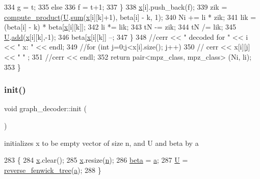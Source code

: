 \begin{DoxyCode}
334         g = t;
335       \textcolor{keywordflow}{else}
336         f = t+1;
337     \}
338     \hyperlink{classgraph__decoder_aa3f2776afe387668cf7f68109428e14e}{x}[i].push\_back(f);
339     zik = \hyperlink{compression__helper_8cpp_ae2afb43aabe50f7d42aae8f82b5a35f4}{compute\_product}(\hyperlink{classgraph__decoder_a2fa9fec2cef06aaa410e57fb59d5c1ad}{U}.\hyperlink{classreverse__fenwick__tree_a672731fd6395b4853430073a099a80e6}{sum}(\hyperlink{classgraph__decoder_aa3f2776afe387668cf7f68109428e14e}{x}[i][k]+1), beta[i] - k, 1);
340     Ni += li * zik;
341     lik = (beta[i] - k) * beta[\hyperlink{classgraph__decoder_aa3f2776afe387668cf7f68109428e14e}{x}[i][k]];
342     li *= lik;
343     tN -= zik;
344     tN /= lik;
345     \hyperlink{classgraph__decoder_a2fa9fec2cef06aaa410e57fb59d5c1ad}{U}.\hyperlink{classreverse__fenwick__tree_a942d7f49b37e53ebfec3076d177691d7}{add}(\hyperlink{classgraph__decoder_aa3f2776afe387668cf7f68109428e14e}{x}[i][k],-1);
346     beta[\hyperlink{classgraph__decoder_aa3f2776afe387668cf7f68109428e14e}{x}[i][k]] --;
347   \}
348   \textcolor{comment}{//cerr << " decoded for " << i << " x: " << endl;}
349   \textcolor{comment}{//for (int j=0;j<x[i].size(); j++)}
350   \textcolor{comment}{//  cerr << x[i][j] << " " ;}
351   \textcolor{comment}{//cerr << endl;}
352   \textcolor{keywordflow}{return} pair<mpz\_class, mpz\_class> (Ni, li);
353 \}
\end{DoxyCode}
\mbox{\label{classgraph__decoder_a97a9dcd5af21ece86fa91adcb41ca9cc}} 
\subsubsection{\texorpdfstring{init()}{init()}}
{\footnotesize\ttfamily void graph\+\_\+decoder\+::init (\begin{DoxyParamCaption}{ }\end{DoxyParamCaption})}



initializes x to be empty vector of size n, and U and beta by a 


\begin{DoxyCode}
283 \{
284   \hyperlink{classgraph__decoder_aa3f2776afe387668cf7f68109428e14e}{x}.clear();
285   \hyperlink{classgraph__decoder_aa3f2776afe387668cf7f68109428e14e}{x}.resize(\hyperlink{classgraph__decoder_a6bc1e72b2f7a913d14b789a6c2d92c1e}{n});
286   \hyperlink{classgraph__decoder_aa57c11e4c09c52101682ff83286162f7}{beta} = \hyperlink{classgraph__decoder_a9dd7c3c11b8a45a12cb7c3c2d2bfa2cc}{a};
287   \hyperlink{classgraph__decoder_a2fa9fec2cef06aaa410e57fb59d5c1ad}{U} = \hyperlink{classreverse__fenwick__tree}{reverse\_fenwick\_tree}(\hyperlink{classgraph__decoder_a9dd7c3c11b8a45a12cb7c3c2d2bfa2cc}{a});
288 \}
\end{DoxyCode}



